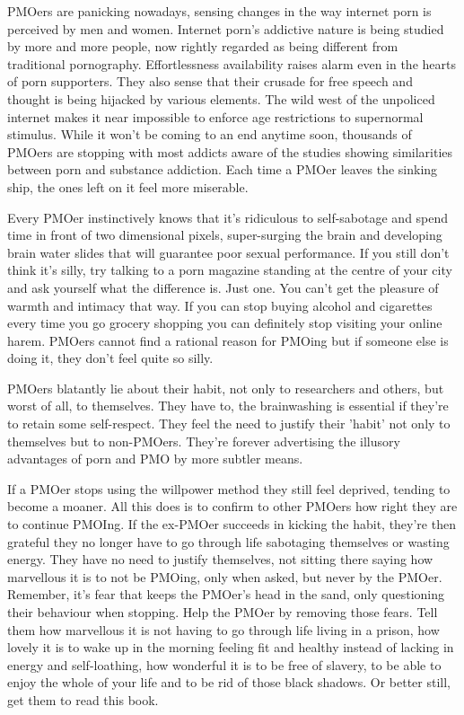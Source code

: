 \documentclass[easypeasy.tex]{subfiles}
\begin{document}
PMOers are panicking nowadays, sensing changes in the way internet porn is perceived by men and women. Internet porn's addictive nature is being studied by more and more people, now rightly regarded as being different from traditional pornography. Effortlessness availability raises alarm even in the hearts of porn supporters. They also sense that their crusade for free speech and thought is being hijacked by various elements. The wild west of the unpoliced internet makes it near impossible to enforce age restrictions to supernormal stimulus. While it won't be coming to an end anytime soon, thousands of PMOers are stopping with most addicts aware of the studies showing similarities between porn and substance addiction. Each time a PMOer leaves the sinking ship, the ones left on it feel more miserable.

Every PMOer instinctively knows that it's ridiculous to self-sabotage and spend time in front of two dimensional pixels, super-surging the brain and developing brain water slides that will guarantee poor sexual performance. If you still don't think it's silly, try talking to a porn magazine standing at the centre of your city and ask yourself what the difference is. Just one. You can't get the pleasure of warmth and intimacy that way. If you can stop buying alcohol and cigarettes every time you go grocery shopping you can definitely stop visiting your online harem. PMOers cannot find a rational reason for PMOing but if someone else is doing it, they don't feel quite so silly.

PMOers blatantly lie about their habit, not only to researchers and others, but worst of all, to themselves. They have to, the brainwashing is essential if they're to retain some self-respect. They feel the need to justify their 'habit' not only to themselves but to non-PMOers. They're forever advertising the illusory advantages of porn and PMO by more subtler means.

If a PMOer stops using the willpower method they still feel deprived, tending to become a moaner. All this does is to confirm to other PMOers how right they are to continue PMOIng. If the ex-PMOer succeeds in kicking the habit, they're then grateful they no longer have to go through life sabotaging themselves or wasting energy. They have no need to justify themselves, not sitting there saying how marvellous it is to not be PMOing, only when asked, but never by the PMOer. Remember, it's fear that keeps the PMOer's head in the sand, only questioning their behaviour when stopping. Help the PMOer by removing those fears. Tell them how marvellous it is not having to go through life living in a prison, how lovely it is to wake up in the morning feeling fit and healthy instead of lacking in energy and self-loathing, how wonderful it is to be free of slavery, to be able to enjoy the whole of your life and to be rid of those black shadows. Or better still, get them to read this book.
\end{document}
